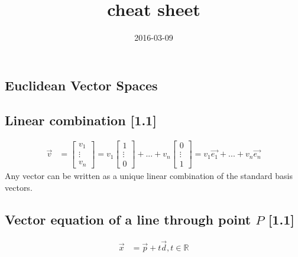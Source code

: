 \documentclass[a4paper,9pt]{extarticle}
\title{cheat sheet}
\date{2016-03-09}
\begin{document}
\begin{multicols*}{2}

% 
%
%
%
%


\section{Euclidean Vector Spaces}
\subsection{Linear combination [1.1]}
\begin{equation} \label{1.1-1}
    \begin{split}
        \vec{v} & = \begin{bmatrix}v_1 \\ \vdots \\ v_n\end{bmatrix} 
            = v_1\begin{bmatrix}1 \\ \vdots \\ 0\end{bmatrix} + ... + 
            v_n\begin{bmatrix}0 \\ \vdots \\ 1\end{bmatrix}
            = v_1 \vec{e_1} + ... + v_n \vec{e_n}
    \end{split}
\end{equation}
Any vector can be written as a unique linear combination of the standard basis vectors.


\subsection{Vector equation of a line through point $P$ [1.1]}
\begin{equation} \label{1.1-2}
    \begin{split}
        \vec{x} & = \vec{p} + t \vec{d}, t \in \mathbb{R}
    \end{split}
\end{equation}


\end{multicols*}
\end{document}

